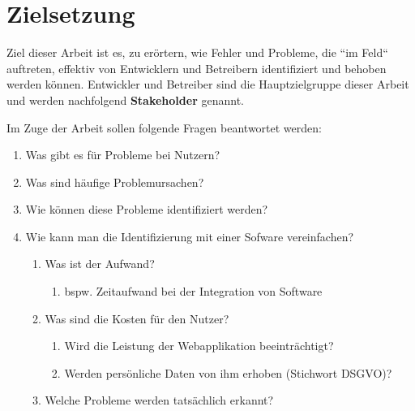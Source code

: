 \section{Zielsetzung}

Ziel dieser Arbeit ist es, zu erörtern, wie Fehler und Probleme, die ``im Feld`` auftreten, effektiv von Entwicklern und Betreibern identifiziert und behoben werden können. Entwickler und Betreiber sind die Hauptzielgruppe dieser Arbeit und werden nachfolgend \textbf{Stakeholder} genannt.

Im Zuge der Arbeit sollen folgende Fragen beantwortet werden:

\begin{enumerate}
	\item Was gibt es für Probleme bei Nutzern?
	\item Was sind häufige Problemursachen?
	\item Wie können diese Probleme identifiziert werden?
	\item Wie kann man die Identifizierung mit einer Sofware vereinfachen?
	\begin{enumerate}
		\item Was ist der Aufwand?
		\begin{enumerate}
			\item bspw. Zeitaufwand bei der Integration von Software
		\end{enumerate}
		\item Was sind die Kosten für den Nutzer?
		\begin{enumerate}
			\item Wird die Leistung der Webapplikation beeinträchtigt?
			\item Werden persönliche Daten von ihm erhoben (Stichwort DSGVO)?
		\end{enumerate}
		\item Welche Probleme werden tatsächlich erkannt?
	\end{enumerate}
\end{enumerate}

